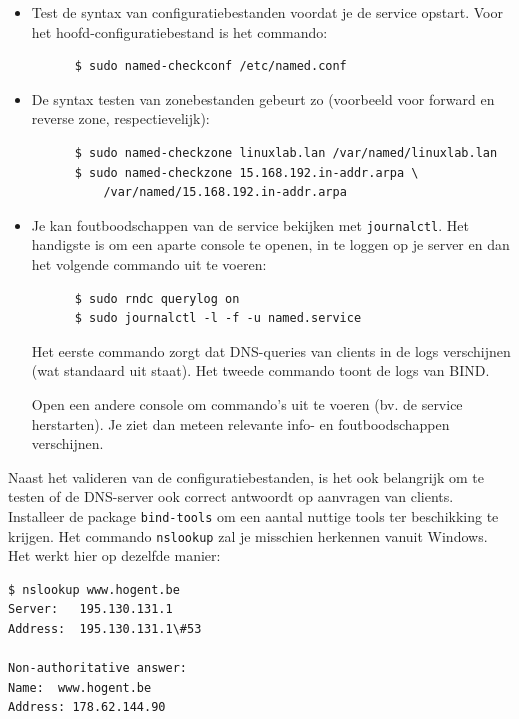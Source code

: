 \begin{itemize}
  \item Test de syntax van configuratiebestanden voordat je de service opstart. Voor het hoofd-configuratiebestand  is het commando:
    \begin{verbatim}
      $ sudo named-checkconf /etc/named.conf
    \end{verbatim}
  \item De syntax testen van zonebestanden gebeurt zo (voorbeeld voor forward en reverse zone, respectievelijk):

    \begin{verbatim}
      $ sudo named-checkzone linuxlab.lan /var/named/linuxlab.lan
      $ sudo named-checkzone 15.168.192.in-addr.arpa \
          /var/named/15.168.192.in-addr.arpa
    \end{verbatim}

\item Je kan foutboodschappen van de service bekijken met \texttt{journalctl}. Het handigste is om een aparte console te openen, in te loggen op je server en dan het volgende commando uit te voeren:

    \begin{verbatim}
      $ sudo rndc querylog on
      $ sudo journalctl -l -f -u named.service
    \end{verbatim}

  Het eerste commando zorgt dat DNS-queries van clients in de logs verschijnen (wat standaard uit staat). Het tweede commando toont de logs van BIND.

  Open een andere console om commando's uit te voeren (bv. de service herstarten). Je ziet dan meteen relevante info- en foutboodschappen verschijnen.
\end{itemize}

Naast het valideren van de configuratiebestanden, is het ook belangrijk om te testen of de DNS-server ook correct antwoordt op aanvragen van clients. Installeer de package \texttt{bind-tools} om een aantal nuttige tools ter beschikking te krijgen. Het commando \texttt{nslookup} zal je misschien herkennen vanuit Windows. Het werkt hier op dezelfde manier:

\begin{verbatim}
$ nslookup www.hogent.be
Server:   195.130.131.1
Address:  195.130.131.1\#53

Non-authoritative answer:
Name:  www.hogent.be
Address: 178.62.144.90
\end{verbatim}

